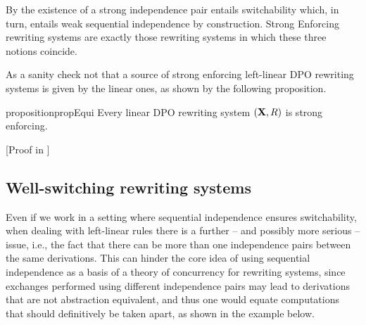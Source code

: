 \documentclass[a4paper,UKenglish,cleveref,pdftex,thm-restate,numberwithinsect,anonymous]{lipics}
\def\R{\mathsf{R}}
\def\X{\textbf {\textup{X}}}
\newcommand{\rem}[2]{{\color{blue}#1}{\color{red}#2}}
\renewcommand{\rem}[2]{}
\begin{document}
\begin{remark}
  By  the existence of a strong independence pair
  entails switchability which, in turn, entails weak sequential
  independence by construction. Strong Enforcing rewriting systems are exactly
  those rewriting systems in which these three notions coincide.
\end{remark}




As a sanity check not that a source of strong enforcing left-linear DPO rewriting systems is given by the linear ones, as shown by the following proposition.

\begin{restatable}{proposition}{propEqui}
  \label{prop:equi}
  Every linear DPO rewriting system $(\X, \R)$ is strong enforcing.
\end{restatable}
[Proof in ]

\subsection{Well-switching rewriting systems}\label{subsec:verytame}

Even if we work in a setting where sequential independence ensures switchability, when dealing with left-linear rules there is a further -- and possibly more serious -- issue, i.e., the fact that there can be more than one independence pairs between the same derivations. This can hinder the core idea of using sequential independence as a basis of a theory of concurrency for rewriting systems, since exchanges performed using different independence pairs may lead to derivations that are not abstraction equivalent, and thus one would equate computations that 
should definitively be taken apart, as shown in the example below.
\end{document}
